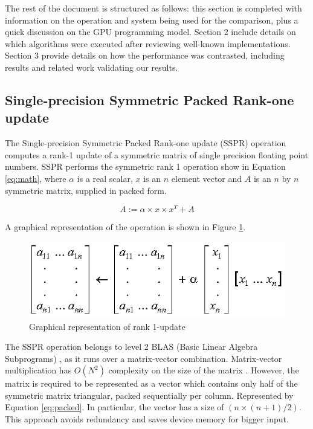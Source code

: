 \documentclass{llncs}
\begin{document}
\smallskip

The rest of the document is structured as follows: this section is completed with information on the operation and system being used for the comparison, plus a quick discussion on the GPU programming model. Section 2 include details on which algorithms were executed after reviewing well-known implementations. Section 3 provide details on how the performance was contrasted, including results and related work validating our results.

\subsection{Single-precision Symmetric Packed Rank-one update}

The Single-precision Symmetric Packed Rank-one update (SSPR) operation computes a rank-1 update of a symmetric matrix of single precision floating point numbers. SSPR performs the symmetric rank 1 operation show in Equation \ref{eq:math},
where $ \alpha $ is a real scalar, $ x $ is an $ n $ element vector and $ A $ is an
$ n $ by $ n $ symmetric matrix, supplied in packed form.

\begin{equation}
    A := \alpha \times x \times x ^{T} + A
\label{eq:math}
\end{equation}

A graphical representation of the operation is shown in Figure \ref{fig:math}.

\begin{figure}[H]
\begin{center}
\includegraphics[scale=0.7]{math.png}
\caption{Graphical representation of rank 1-update}
\label{fig:math}
\end{center}
\end{figure}

The SSPR operation belongs to level 2 BLAS (Basic Linear Algebra Subprograms) \cite{blas} \cite{blas-updated},
as it runs over a matrix-vector combination. Matrix-vector multiplication has $ O(N^{2}) $ complexity on the size of the matrix \cite{matmul}.  However, the matrix is required to be represented as a vector which contains only half of the symmetric matrix triangular, packed sequentially per column. Represented by Equation \ref{eq:packed}. In particular, the vector has a size of $ (n \times (n + 1) / 2) $. This approach avoids redundancy and saves device memory for bigger input.
\end{document}

